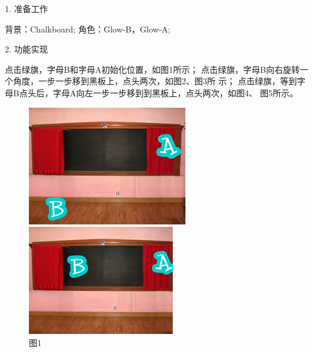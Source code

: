 \documentclass[10.5pt, a4paper]{article}
\begin{document}
\begin{enumerate}
        1. 准备工作
        \begin{tasks}[label = (\arabic*)]
            \task 背景：Chalkboard;
            \task 角色：Glow-B，Glow-A;
        \end{tasks}
        2. 功能实现
        \begin{tasks}[label = (\arabic*)]
            \task 点击绿旗，字母B和字母A初始化位置，如图1所示；
            \task 点击绿旗，字母B向右旋转一个角度，一步一步移到黑板上，点头两次，如图2、图3所
            示；
            \task 点击绿旗，等到字母B点头后，字母A向左一步一步移到到黑板上，点头两次，如图4、
            图5所示。
        \end{tasks}
        \begin{figure}[htbp]
            \centering
            \begin{minipage}[t]{.18\textwidth}
                \centering
                \includegraphics[width=\textwidth]{37-1.png}
                \caption*{图1}
            \end{minipage}
            \begin{minipage}[t]{.18\textwidth}
                \includegraphics[width=\textwidth]{37-2.png}

\end{minipage}
\end{figure}
\end{enumerate}
\end{document}
